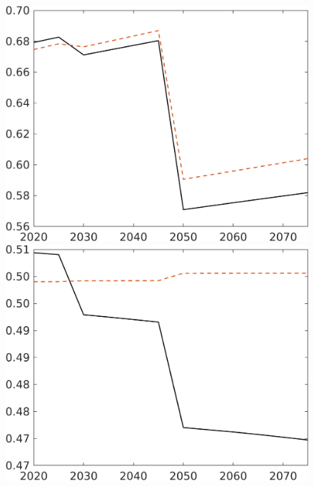 \begin{figure}[h!!]
\begin{minipage}[]{0.32\textwidth}
	\end{minipage}
	\begin{minipage}[]{0.32\textwidth}
		\includegraphics[width=1\textwidth]{../../codding_model/own_basedOnFried/optimalPol_elastS_DisuSci/figures/all_1705/comp_notaul_OPT_T_NoTaus_C_spillover0_sep1_BN0_ineq0_etaa0.79.png}
	\end{minipage}
	\begin{minipage}[]{0.32\textwidth}
		\includegraphics[width=1\textwidth]{../../codding_model/own_basedOnFried/optimalPol_elastS_DisuSci/figures/all_1705/comp_notaul_OPT_T_NoTaus_hh_spillover0_sep1_BN0_ineq0_etaa0.79.png}

\end{minipage}
\end{figure}
